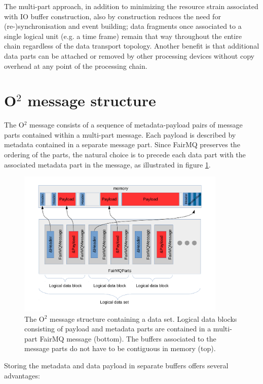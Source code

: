\documentclass[a4paper,twoside]{article}
\def\O2{O$^2$}
\begin{document}
The multi-part approach, in addition to minimizing the resource strain associated with IO buffer construction, also by construction reduces the need for (re-)synchronisation and event building; data fragments once associated to a single logical unit (e.g. a time frame) remain that way throughout the entire chain regardless of the data transport topology. Another benefit is that additional data parts can be attached or removed by other processing devices without copy overhead at any point of the processing chain.

\section{\O2 message structure}

The \O2 message consists of a sequence of metadata-payload pairs of message parts contained within a multi-part message. Each payload is described by metadata contained in a separate message part. Since FairMQ preserves the ordering of the parts, the natural choice is to precede each data part with the associated metadata part in the message, as illustrated in figure \ref{fig:o2message}. 

\begin{figure}[h]
  \centering
  \includegraphics[width=0.89\textwidth]{multipartO2message.pdf}
  \caption{The \O2 message structure containing a data set. Logical data blocks consisting of payload and metadata parts are contained in a multi-part FairMQ message (bottom). The buffers associated to the message parts do not have to be contiguous in memory (top).}
  \label{fig:o2message} 
\end{figure}

Storing the metadata and data payload in separate buffers offers several advantages:
\end{document}
